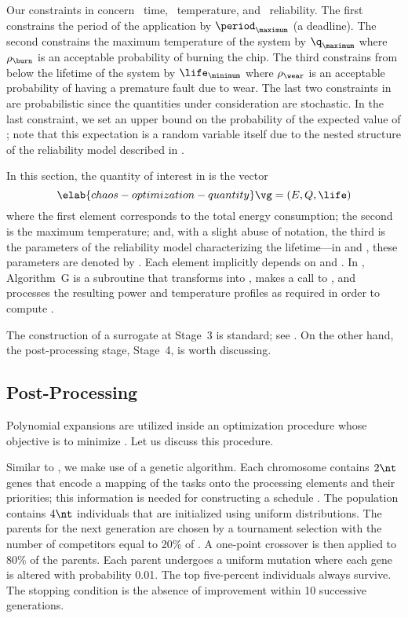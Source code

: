 Our constraints in  concern \one~time,
\two~temperature, and \three~reliability. The first constrains the period of the
application by $\period_\maximum$ (a deadline). The second constrains the
maximum temperature of the system by $\q_\maximum$ where $\rho_\burn$ is an
acceptable probability of burning the chip. The third constrains from below the
lifetime of the system by $\life_\minimum$ where $\rho_\wear$ is an acceptable
probability of having a premature fault due to wear. The last two constraints in
 are probabilistic since the quantities
under consideration are stochastic. In the last constraint, we set an upper
bound on the probability of the expected value of \life; note that this
expectation is a random variable itself due to the nested structure of the
reliability model described in .

In this section, the quantity of interest \g in  is the
vector
\begin{equation} \elab{chaos-optimization-quantity}
  \vg = (E, Q, \life)
\end{equation}
where the first element corresponds to the total energy consumption; the second
is the maximum temperature; and, with a slight abuse of notation, the third is
the parameters of the reliability model characterizing the lifetime---in
 and , these parameters
are denoted by \vg. Each element implicitly depends on \schedule and \vu. In
, Algorithm~G is a subroutine that transforms \vz into
\vu, makes a call to , and processes
the resulting power and temperature profiles as required in order to compute
\vg.

The construction of a surrogate at Stage~3 is standard; see
. On the other hand, the post-processing stage,
Stage~4, is worth discussing.

\subsection{Post-Processing}

Polynomial expansions are utilized inside an optimization procedure whose
objective is to minimize . Let us discuss
this procedure.

Similar to , we make use of a genetic algorithm.
Each chromosome contains $2 \nt$ genes that encode a mapping of the tasks onto
the processing elements and their priorities; this information is needed for
constructing a schedule \schedule. The population contains $4 \nt$ individuals
that are initialized using uniform distributions. The parents for the next
generation are chosen by a tournament selection with the number of competitors
equal to 20\% of \nt. A one-point crossover is then applied to 80\% of the
parents. Each parent undergoes a uniform mutation where each gene is altered
with probability 0.01. The top five-percent individuals always survive. The
stopping condition is the absence of improvement within 10 successive
generations.

